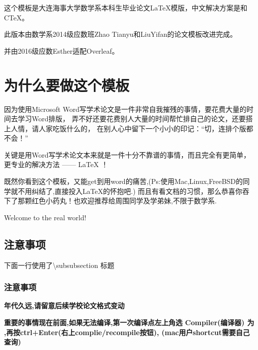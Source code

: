 这个模板是大连海事大学数学系本科生毕业论文\LaTeX 模版，中文解决方案是\XeLaTeX 和CTeX。

此版本由数学系2014级应数班Zhao Tianyu和LiuYifan的论文模板改进完成。

并由2016级应数Esther适配Overleaf。
\section{为什么要做这个模板}\label{ch:intr}


因为使用Microsoft 
Word写学术论文是一件非常自我摧残的事情，要花费大量的时间去学习Word排版，
弄不好还要花费别人大量的时间帮忙排自己的论文，还要搭上人情，请人家吃饭什么的，
在别人心中留下一个小小的印记：“切，连排个版都不会！”

关键是用Word写学术论文本来就是一件十分不靠谱的事情，而且完全有更简单，更专业的解决方法 —— {\LaTeX} ！

既然你看到这个模板，又能get到用word的痛苦,(Ps:使用Mac,Linux,FreeBSD的同学就不用纠结了,直接投入\LaTeX 的怀抱吧.) 而且有看文档的习惯，那么恭喜你吞下了那颗红色小药丸！也欢迎推荐给周围同学及学弟妹,不限于数学系.

Welcome to the real world!

\subsection{注意事项}
\label{sec:fastguide}
下面一行使用了\textbackslash subsubsection 标题
\subsubsection{注意事项}
\label{sec:features}

\textbf{年代久远,请留意后续学校论文格式变动}


\textbf{重要的事情现在前面,如果无法编译,第一次编译点左上角选 Compiler(编译器) 为 \XeLaTeX,再按ctrl+Enter(右上complie/recompile按钮), (mac用户shortcut需要自己查询)}


